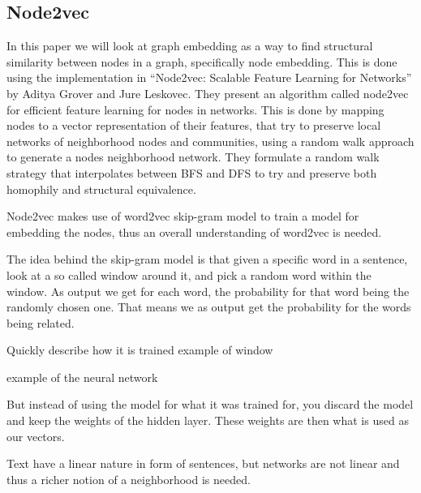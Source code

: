 \subsection{Node2vec}
In this paper we will look at graph embedding as a way to find structural similarity between nodes in a graph, specifically node embedding. This is done using the implementation in “Node2vec: Scalable Feature Learning for Networks” by Aditya Grover and Jure Leskovec. They present an algorithm called node2vec for efficient feature learning for nodes in networks. This is done by mapping nodes to a vector representation of their features, that try to preserve local networks of neighborhood nodes and communities, using a random walk approach to generate a nodes neighborhood network. They formulate a random walk strategy that interpolates between BFS and DFS to try and preserve both homophily and structural equivalence.

Node2vec makes use of word2vec skip-gram model to train a model for embedding the nodes, thus an overall understanding of word2vec is needed.

The idea behind the skip-gram model is that given a specific word in a sentence, look at a so called window around it, and pick a random word within the window. As output we get for each word, the probability for that word being the randomly chosen one. That means we as output get the probability for the words being related.

Quickly describe how it is trained
example of window

\TODO example of the neural network

But instead of using the model for what it was trained for, you discard the model and keep the weights of the hidden layer. These weights are then what is used as our vectors.

Text have a linear nature in form of sentences, but networks are not linear and thus a richer notion of a neighborhood is needed.

